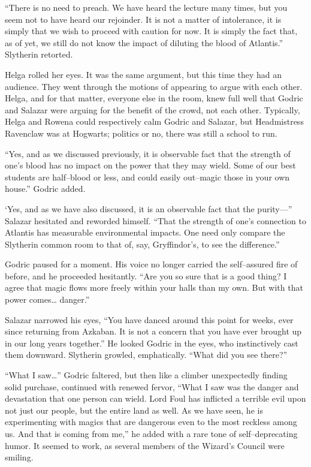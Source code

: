 “There is no need to preach. We have heard the lecture many times, but you seem not to have heard our rejoinder. It is not a matter of intolerance, it is simply that we wish to proceed with caution for now. It is simply the fact that, as of yet, we still do not know the impact of diluting the blood of Atlantis.” Slytherin retorted.

Helga rolled her eyes. It was the same argument, but this time they had an audience. They went through the motions of appearing to argue with each other. Helga, and for that matter, everyone else in the room, knew full well that Godric and Salazar were arguing for the benefit of the crowd, not each other. Typically, Helga and Rowena could respectively calm Godric and Salazar, but Headmistress Ravenclaw was at Hogwarts; politics or no, there was still a school to run.

“Yes, and as we discussed previously, it is observable fact that the strength of one’s blood has no impact on the power that they may wield. Some of our best students are half\mbox{--}blood or less, and could easily out\mbox{--}magic those in your own house.” Godric added.

‘Yes, and as we have also discussed, it is an observable fact that the purity\mbox{---}” Salazar hesitated and reworded himself. “That the strength of one’s connection to Atlantis has measurable environmental impacts. One need only compare the Slytherin common room to that of, say, Gryffindor’s, to see the difference.”

Godric paused for a moment. His voice no longer carried the self\mbox{--}assured fire of before, and he proceeded hesitantly. “Are you so sure that is a good thing? I agree that magic flows more freely within your halls than my own. But with that power comes… danger.”

Salazar narrowed his eyes, “You have danced around this point for weeks, ever since returning from Azkaban. It is not a concern that you have ever brought up in our long years together.” He looked Godric in the eyes, who instinctively cast them downward. Slytherin growled, emphatically. “What did you see there?”

“What I saw…” Godric faltered, but then like a climber unexpectedly finding solid purchase, continued with renewed fervor, “What I saw was the danger and devastation that one person can wield. Lord Foul has inflicted a terrible evil upon not just our people, but the entire land as well. As we have seen, he is experimenting with magics that are dangerous even to the most reckless among us. And that is coming from me,” he added with a rare tone of self\mbox{--}deprecating humor. It seemed to work, as several members of the Wizard’s Council were smiling.

